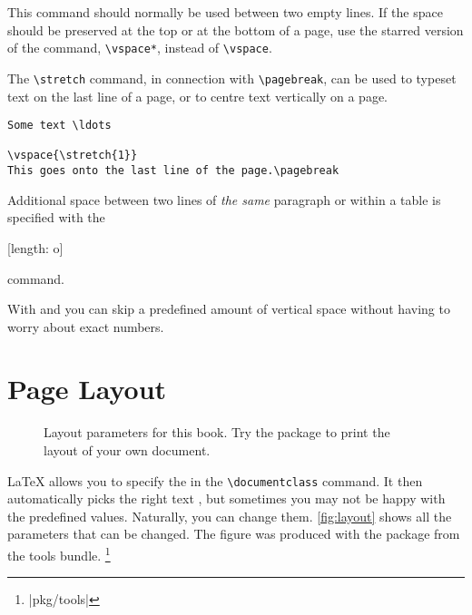 This command should normally be used between two empty lines.  If the
space should be preserved at the top or at the bottom of a page, use
the starred version of the command, \verb|\vspace*|, instead of \verb|\vspace|.

The \verb|\stretch| command, in connection with \verb|\pagebreak|, can
be used to typeset text on the last line of a page, or to centre text
vertically on a page.
\begin{code}
\begin{verbatim}
Some text \ldots

\vspace{\stretch{1}}
This goes onto the last line of the page.\pagebreak
\end{verbatim}
\end{code}

Additional space between two lines of \emph{the same} paragraph or
within a table is specified with the
\begin{lscommand}
  \csi{\bs}[length: o]
\end{lscommand}
\noindent command.

With  and  you can skip a predefined amount of
vertical space without having to worry about exact numbers.

\section{Page Layout}

\begin{figure}[!hp]
  \begin{center}
    \makeatletter\@mylayout\makeatother
  \end{center}
  \vspace*{1.8cm}
  \caption[Layout parameters for this book.]{Layout parameters for this book. Try the  package to print the layout of your own document.}\label{fig:layout}
\end{figure}

\LaTeX{} allows you to specify the  in the
\verb|\documentclass| command. It then automatically picks the right
text , but sometimes you may not be happy with
the predefined values. Naturally, you can change them.
\thispagestyle{fancyplain}
\autoref{fig:layout} shows all the parameters that can be changed.
The figure was produced with the  package from the tools bundle.%
\footnote{\CTANref|pkg/tools|}

